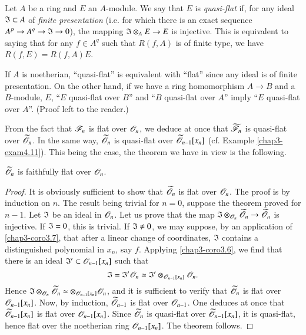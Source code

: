 Let $A$ be a ring and $E$ an $A$-module. We say that $E$ is {\em quasi-flat} if, for any ideal $\mathfrak{I}\subset A$ of {\em finite presentation} (i.e. for which there is an exact sequence $A^{p}\to A^{q}\to \mathfrak{I}\to 0$), the mapping $\mathfrak{I}\otimes_{A}E\to E$ is injective. This is equivalent to saying that for any $f\in A^{q}$ such that $R(f,A)$ is of finite type, we have $R(f,E)=R(f,A)E$.

If $A$ is noetherian, ``quasi-flat'' is equivalent with ``flat'' since any ideal is of finite presentation. On the other hand, if we have a ring homomorphism $A\to B$ and a $B$-module, $E$, ``$E$ quasi-flat over $B$'' and ``$B$ quasi-flat over $A$'' imply ``$E$ quasi-flat over $A$''. (Proof left to the reader.)

\begin{examples*}
From the fact that $\mathscr{F}_{n}$ is flat over $\mathscr{O}_{n}$, we deduce at once that $\widetilde{\mathscr{F}}_{n}$ is quasi-flat over $\widetilde{\mathscr{O}}_{n}$. In the same way, $\widetilde{\mathscr{O}}_{n}$ is quasi-flat over $\widetilde{\mathscr{O}}_{n-1}[x_{n}]$ (cf. Example \ref{chap3-exam4.11}). This being the case, the theorem we have in view is the following.
\end{examples*}

\begin{theorem}[Oka]\label{chap3-thm4.12}
$\widetilde{\mathscr{O}}_{n}$ is faithfully flat over $\mathscr{O}_{n}$.
\end{theorem}

\begin{proof}
It is obviously sufficient to show that $\widetilde{\mathscr{O}}_{n}$ is flat over $\mathscr{O}_{n}$. The proof is by induction on $n$. The result being trivial for $n=0$, suppose the theorem proved for $n-1$. Let $\mathfrak{I}$ be an ideal in $\mathscr{O}_{n}$. Let us prove that the map $\mathfrak{I}\otimes_{\mathscr{O}_{n}}\widetilde{\mathscr{O}}_{n}\to \widetilde{\mathscr{O}}_{n}$ is injective. If $\mathfrak{I}=0$, this is trivial. If $\mathfrak{I}\neq 0$, we may suppose, by an application of \ref{chap3-coro3.7}, that after a linear change of coordinates, $\mathfrak{I}$ contains a distinguished polynomial in $x_{n}$, say $f$. Applying \ref{chap3-coro3.6}, we find that there is an ideal $\mathfrak{I}'\subset\mathscr{O}_{n-1}[x_{n}]$ such that
$$
\mathfrak{I}=\mathfrak{I}'\mathscr{O}_{n}\simeq \mathfrak{I}'\otimes_{\mathscr{O}_{n-1}[x_{n}]}\mathscr{O}_{n}.
$$
Hence $\mathfrak{I}\otimes_{\mathscr{O}_{n}}\widetilde{\mathscr{O}}_{n}\simeq \otimes_{\mathscr{O}_{n-1}[x_{n}]}\mathscr{O}_{n}$, and it is sufficient to verify that $\widetilde{\mathscr{O}}_{n}$ is flat over $\mathscr{O}_{n-1}[x_{n}]$. Now, by induction, $\widetilde{\mathscr{O}}_{n-1}$ is flat over $\mathscr{O}_{n-1}$. One deduces at once that $\widetilde{\mathscr{O}}_{n-1}[x_{n}]$ is flat over $\mathscr{O}_{n-1}[x_{n}]$. Since $\widetilde{\mathscr{O}}_{n}$ is quasi-flat over $\widetilde{\mathscr{O}}_{n-1}[x_{n}]$, it is quasi-flat, hence flat over the noetherian ring $\mathscr{O}_{n-1}[x_{n}]$. The theorem follows.
\end{proof}

